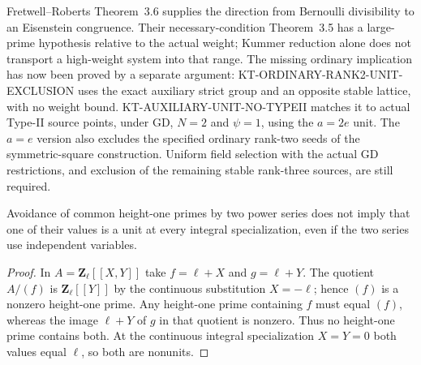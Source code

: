 Fretwell--Roberts Theorem~3.6 supplies the direction from
Bernoulli divisibility to an Eisenstein congruence. Their
necessary-condition Theorem~3.5 has a large-prime hypothesis
relative to the actual weight; Kummer reduction alone does not
transport a high-weight system into that range. The missing
ordinary implication has now been proved by a separate argument:
KT-ORDINARY-RANK2-UNIT-EXCLUSION uses the exact auxiliary strict
group and an opposite stable lattice, with no weight bound.
KT-AUXILIARY-UNIT-NO-TYPEII matches it to actual Type-II source
points, under GD, $N=2$ and $\psi=1$, using the $a=2e$ unit.
The $a=e$ version also excludes the specified ordinary rank-two
seeds of the symmetric-square construction. Uniform field
selection with the actual GD restrictions, and exclusion of
the remaining stable rank-three sources, are still required.

\begin{lemma}
Avoidance of common height-one primes by two power series does
not imply that one of their values is a unit at every integral
specialization, even if the two series use independent variables.
\end{lemma}
\begin{proof}
In $A=\mathbf Z_\ell[[X,Y]]$ take $f=\ell+X$ and $g=\ell+Y$.
The quotient $A/(f)$ is $\mathbf Z_\ell[[Y]]$ by the continuous
substitution $X=-\ell$; hence $(f)$ is a nonzero height-one
prime. Any height-one prime containing $f$ must equal $(f)$,
whereas the image $\ell+Y$ of $g$ in that quotient is nonzero.
Thus no height-one prime contains both. At the continuous
integral specialization $X=Y=0$ both values equal $\ell$,
so both are nonunits.
\end{proof}
